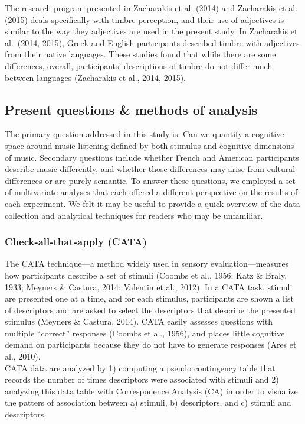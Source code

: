 \documentclass[
  english,
  man,floatsintext]{apa6}
\begin{document}
The research program presented in Zacharakis et al. (2014) and Zacharakis et al. (2015) deals specifically with timbre perception, and their use of adjectives is similar to the way they adjectives are used in the present study. In Zacharakis et al.~(2014, 2015), Greek and English participants described timbre with adjectives from their native languages. These studies found that while there are some differences, overall, participants' descriptions of timbre do not differ much between languages (Zacharakis et al., 2014, 2015).

\hypertarget{present-questions-methods-of-analysis}{%
\subsection{Present questions \& methods of analysis}\label{present-questions-methods-of-analysis}}

The primary question addressed in this study is: Can we quantify a cognitive space around music listening defined by both stimulus and cognitive dimensions of music. Secondary questions include whether French and American participants describe music differently, and whether those differences may arise from cultural differences or are purely semantic. To answer these questions, we employed a set of multivariate analyses that each offered a different perspective on the results of each experiment. We felt it may be useful to provide a quick overview of the data collection and analytical techniques for readers who may be unfamiliar.

\hypertarget{check-all-that-apply-cata}{%
\subsubsection{Check-all-that-apply (CATA)}\label{check-all-that-apply-cata}}

The CATA technique---a method widely used in sensory evaluation---measures how participants describe a set of stimuli (Coombs et al., 1956; Katz \& Braly, 1933; Meyners \& Castura, 2014; Valentin et al., 2012). In a CATA task, stimuli are presented one at a time, and for each stimulus, participants are shown a list of descriptors and are asked to select the descriptors that describe the presented stimulus (Meyners \& Castura, 2014). CATA easily assesses questions with multiple ``correct'' responses (Coombs et al., 1956), and places little cognitive demand on participants because they do not have to generate responses (Ares et al., 2010).\\
CATA data are analyzed by 1) computing a pseudo contingency table that records the number of times descriptors were associated with stimuli and 2) analyzing this data table with Corresponence Analysis (CA) in order to visualize the patters of association between a) stimuli, b) descriptors, and c) stimuli and descriptors.
\end{document}
